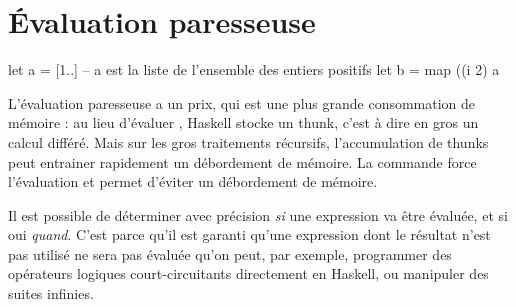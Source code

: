 \section{Évaluation paresseuse}
\label{lazyness}

\begin{haskellcode}
let a = [1..] -- a est la liste de l'ensemble des entiers positifs
let b = map ((^^) 2) a
\end{haskellcode}

L'évaluation paresseuse a un prix, qui est une plus grande consommation de mémoire : au lieu d'évaluer , Haskell stocke un \gls{thunk}, c'est à dire en gros un calcul différé. Mais sur les gros traitements récursifs, l'accumulation de \glspl{thunk} peut entrainer rapidement un débordement de mémoire. La commande  force l'évaluation et permet d'éviter un débordement de mémoire.

\begin{infobox}
Il est possible de déterminer avec précision \emph{si} une expression va être évaluée, et si oui \emph{quand}. C'est parce qu'il est garanti qu'une expression dont le résultat n'est pas utilisé ne sera pas évaluée qu'on peut, par exemple, programmer des opérateurs logiques court-circuitants directement en Haskell, ou manipuler des suites infinies.
\end{infobox}
